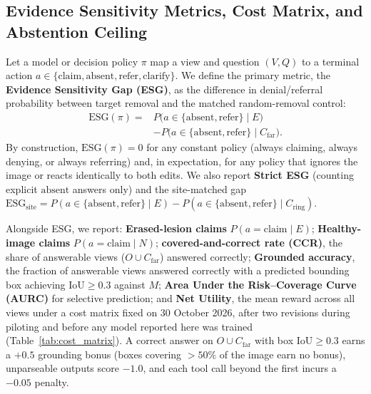 \documentclass[5p,times,twocolumn,authoryear]{elsarticle}
\begin{document}
\subsection{Evidence Sensitivity Metrics, Cost Matrix, and Abstention Ceiling}
\label{subsec:method_metrics}
Let a model or decision policy $\pi$ map a view and question $(V, Q)$ to a terminal action $a \in \{\text{claim}, \text{absent}, \text{refer}, \text{clarify}\}$. We define the primary metric, the \textbf{Evidence Sensitivity Gap (ESG)}, as the difference in denial/referral probability between target removal and the matched random-removal control:
\begin{equation}
\label{eq:esg}
\begin{split}
\text{ESG}(\pi) = {}& P\big(a \in \{\text{absent}, \text{refer}\} \mid E\big)\\
&- P\big(a \in \{\text{absent}, \text{refer}\} \mid C_{\text{far}}\big).
\end{split}
\end{equation}
By construction, $\text{ESG}(\pi) = 0$ for any constant policy (always claiming, always denying, or always referring) and, in expectation, for any policy that ignores the image or reacts identically to both edits. We also report \textbf{Strict ESG} (counting explicit $\text{absent}$ answers only) and the site-matched gap $\text{ESG}_{\text{site}} = P(a \in \{\text{absent}, \text{refer}\} \mid E) - P(a \in \{\text{absent}, \text{refer}\} \mid C_{\text{ring}})$.

Alongside ESG, we report: \textbf{Erased-lesion claims} $P(a = \text{claim} \mid E)$; \textbf{Healthy-image claims} $P(a = \text{claim} \mid N)$; \textbf{covered-and-correct rate (CCR)}, the share of answerable views ($O \cup C_{\text{far}}$) answered correctly; \textbf{Grounded accuracy}, the fraction of answerable views answered correctly with a predicted bounding box achieving $\text{IoU} \ge 0.3$ against $M$; \textbf{Area Under the Risk--Coverage Curve (AURC)} \citep{geifman2017selective} for selective prediction; and \textbf{Net Utility}, the mean reward across all views under a cost matrix fixed on 30 October 2026, after two revisions during piloting and before any model reported here was trained (Table~\ref{tab:cost_matrix}). A correct answer on $O \cup C_{\text{far}}$ with box $\text{IoU} \ge 0.3$ earns a $+0.5$ grounding bonus (boxes covering $>50\%$ of the image earn no bonus), unparseable outputs score $-1.0$, and each tool call beyond the first incurs a $-0.05$ penalty.
\end{document}
